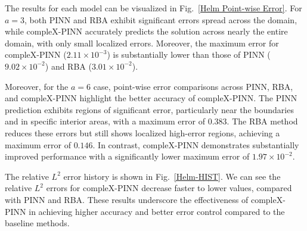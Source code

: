 The results for each model can be visualized in Fig.~\ref{Helm Point-wise Error}. For $a = 3$, both PINN and RBA exhibit significant errors spread across the domain, while compleX-PINN accurately predicts the solution across nearly the entire domain, with only small localized errors. Moreover, the maximum error for compleX-PINN ($2.11 \times 10^{-3}$) is substantially lower than those of PINN ($9.02 \times 10^{-2}$) and RBA ($3.01 \times 10^{-2}$).



Moreover, for the $a = 6$ case, point-wise error comparisons across PINN, RBA, and compleX-PINN highlight the better accuracy of compleX-PINN. The PINN prediction exhibits regions of significant error, particularly near the boundaries and in specific interior areas, with a maximum error of $0.383$. The RBA method reduces these errors but still shows localized high-error regions, achieving a maximum error of $0.146$. In contrast, compleX-PINN demonstrates substantially improved performance with a significantly lower maximum error of $1.97\times 10^{-2}$.


The relative $L^2$ error history is shown in Fig.~\ref{Helm-HIST}. We can see the relative $L^2$ errors for compleX-PINN decrease faster to lower values, compared with PINN and RBA. These results underscore the effectiveness of compleX-PINN in achieving higher accuracy and better error control compared to the baseline methods.


